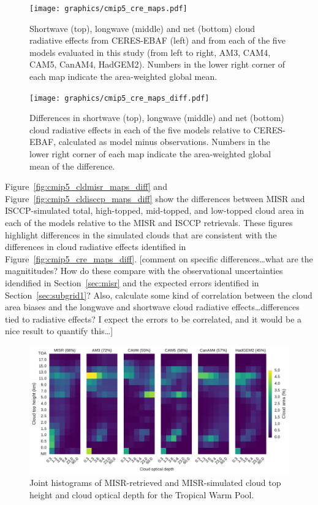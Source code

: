 \begin{figure}[htbp]
\centering
\texttt{[image: graphics/cmip5\_cre\_maps.pdf]}
\caption{\label{fig:cmip5_cre_maps}Shortwave (top), longwave (middle)
and net (bottom) cloud radiative effects from CERES-EBAF (left) and from
each of the five models evaluated in this study (from left to right,
AM3, CAM4, CAM5, CanAM4, HadGEM2). Numbers in the lower right corner of
each map indicate the area-weighted global
mean.}\label{fig:cmip5ux5fcreux5fmaps}
\end{figure}

\begin{figure}[htbp]
\centering
\texttt{[image: graphics/cmip5\_cre\_maps\_diff.pdf]}
\caption{\label{fig:cmip5_cre_maps_diff}Differences in shortwave (top),
longwave (middle) and net (bottom) cloud radiative effects in each of
the five models relative to CERES-EBAF, calculated as model minus
observations. Numbers in the lower right corner of each map indicate the
area-weighted global mean of the
difference.}\label{fig:cmip5ux5fcreux5fmapsux5fdiff}
\end{figure}

Figure~\ref{fig:cmip5_cldmisr_maps_diff} and
Figure~\ref{fig:cmip5_cldisccp_maps_diff} show the differences between
MISR and ISCCP-simulated total, high-topped, mid-topped, and low-topped
cloud area in each of the models relative to the MISR and ISCCP
retrievals. These figures highlight differences in the simulated clouds
that are consistent with the differences in cloud radiative effects
identified in Figure~\ref{fig:cmip5_cre_maps_diff}. {[}comment on
specific differences\ldots{}what are the magnititudes? How do these
compare with the observational uncertainties idendified in
Section~\ref{sec:misr} and the expected errors identified in
Section~\ref{sec:subgrid1}? Also, calculate some kind of correlation
between the cloud area biases and the longwave and shortwave cloud
radiative effects\ldots{}differences tied to radiative effects? I expect
the errors to be correlated, and it would be a nice result to quantify
this\ldots{}{]}

\begin{figure}[htbp]
\centering
\includegraphics{graphics/cmip5_clMISR_TropicalWarmPool.pdf}
\caption{\label{fig:cmip5_clMISR_TropicalWarmPool}Joint histograms of
MISR-retrieved and MISR-simulated cloud top height and cloud optical
depth for the Tropical Warm
Pool.}\label{fig:cmip5ux5fclMISRux5fTropicalWarmPool}
\end{figure}

